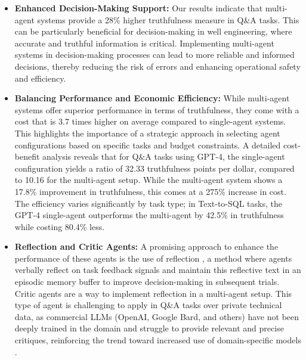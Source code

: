                 \begin{itemize}
                
                    \item \textbf{Enhanced Decision-Making Support:}
                        Our results indicate that multi-agent systems provide a 28\% higher truthfulness measure in Q\&A tasks. This can be particularly beneficial for decision-making in well engineering, where accurate and truthful information is critical.
                        Implementing multi-agent systems in decision-making processes can lead to more reliable and informed decisions, thereby reducing the risk of errors and enhancing operational safety and efficiency.
                    
                    \item \textbf{Balancing Performance and Economic Efficiency:}
                        While multi-agent systems offer superior performance in terms of truthfulness, they come with a cost that is 3.7 times higher on average compared to single-agent systems.
                        This highlights the importance of a strategic approach in selecting agent configurations based on specific tasks and budget constraints. 
                        A detailed cost-benefit analysis reveals that for Q\&A tasks using GPT-4, the single-agent configuration yields a ratio of 32.33 truthfulness points per dollar, compared to 10.16 for the multi-agent setup. While the multi-agent system shows a 17.8\% improvement in truthfulness, this comes at a 275\% increase in cost. The efficiency varies significantly by task type; in Text-to-SQL tasks, the GPT-4 single-agent outperforms the multi-agent by 42.5\% in truthfulness while costing 80.4\% less. 
                        
                    \item \textbf{Reflection and Critic Agents:}
                        A promising approach to enhance the performance of these agents is the use of reflection \cite{Shinn2023}, a method where agents verbally reflect on task feedback signals and maintain this reflective text in an episodic memory buffer to improve decision-making in subsequent trials. Critic agents are a way to implement reflection in a multi-agent setup. This type of agent is challenging to apply in Q\&A tasks over private technical data, as commercial LLMs (OpenAI, Google Bard, and others) have not been deeply trained in the domain and struggle to provide relevant and precise critiques, reinforcing the trend toward increased use of domain-specific models \cite{Shah2024, Meena2023, Ghosh2023}.                
                        

\end{itemize}
